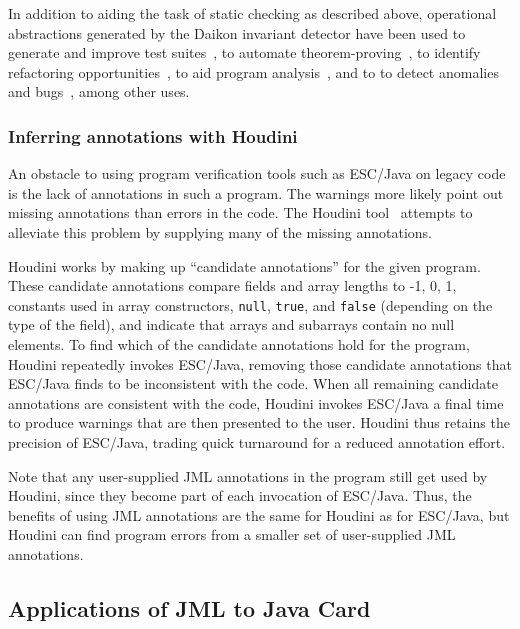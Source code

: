 In addition to aiding the task of static checking as described above,
operational abstractions generated by the Daikon invariant detector
have been used to generate and improve test
suites~\cite{HarderME03,XieN2003:ASE,GuptaH2003}, to automate
theorem-proving~\cite{NeWinE02:TR841,NeWinEGKL04:STTT}, to identify
refactoring opportunities~\cite{KataokaEGN01}, to aid program
analysis~\cite{DodooDLE02,DodooLE2003:TR}, and to to detect anomalies
and bugs~\cite{RazKS2002,GroceV2003,Brun2003}, among other uses.

\subsubsection{Inferring annotations with Houdini}
\label{houdini}

An obstacle to using program verification tools such as ESC/Java on
legacy code is the lack of annotations in such a program.  The
warnings
more likely point out missing annotations than errors in the code.
The Houdini tool~\cite{Flanagan-Et-Al01,Houdini-theory:IPL} attempts
to alleviate this problem by supplying many of the missing
annotations.

Houdini works by making up ``candidate annotations'' for the given
program.  These candidate annotations compare fields and array lengths
to -1, 0, 1, constants used in array constructors, \texttt{null},
\texttt{true}, and \texttt{false} (depending on the type of the
field), and indicate that arrays and subarrays contain no null
elements.  To find which of the candidate annotations hold for the
program, Houdini repeatedly invokes ESC/Java, removing those candidate
annotations that ESC/Java finds to be inconsistent with the code.
When all remaining candidate annotations are consistent with the code,
Houdini invokes ESC/Java a final time to produce warnings that are
then presented to the user.  Houdini thus retains the precision of
ESC/Java, trading quick turnaround for a reduced annotation effort.

Note that any user-supplied JML annotations in the program still get
used by Houdini, since they become part of each invocation of
ESC/Java.  Thus, the benefits of using JML annotations are the same
for Houdini as for ESC/Java, but Houdini can find program errors from
a smaller set of user-supplied JML annotations.

\subsection{Applications of JML to Java Card}
\label{applications}

